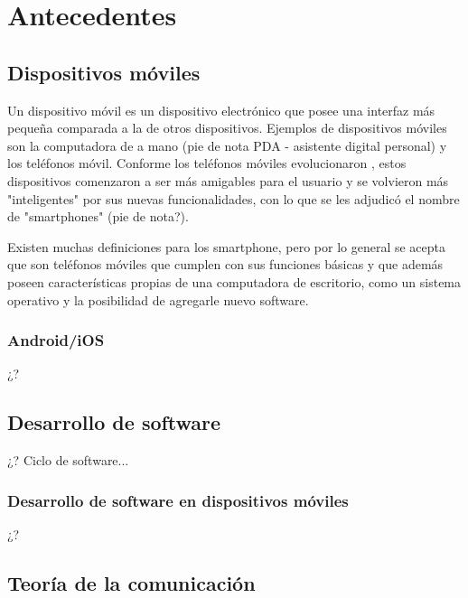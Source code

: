 \chapter{Antecedentes}
\label{antecedentes}

\section{Dispositivos m{\'{o}}viles}

Un dispositivo m{\'{o}}vil es un dispositivo electr{\'{o}}nico 
\citet{ChallengeMobile} que posee una interfaz m{\'{a}}s pequeña 
comparada a la de otros dispositivos. Ejemplos de dispositivos 
m{\'{o}}viles son la computadora de a mano (pie de nota PDA - 
asistente digital personal) y los tel{\'{e}}fonos m{\'{o}}vil. 
Conforme los tel{\'{e}}fonos m{\'{o}}viles evolucionaron 
\citet{MobileEducation}, estos dispositivos comenzaron a ser m{\'{a}}s amigables para el usuario y se volvieron m{\'{a}}s "inteligentes" por sus nuevas funcionalidades, con lo que se les adjudic{\'{o}} el nombre de "smartphones" (pie de nota?).

Existen muchas definiciones para los smartphone, pero por lo general se acepta \citet{MobileEducation} que son tel{\'{e}}fonos m{\'{o}}viles que cumplen con sus funciones b{\'{a}}sicas y que adem{\'{a}}s poseen caracter{\'{i}}sticas propias de una computadora de escritorio, como un sistema operativo y la posibilidad de agregarle nuevo software.

\subsection{Android/iOS}

¿?

\section{Desarrollo de software}

¿? Ciclo de software...

\subsection{Desarrollo de software en dispositivos m{\'{o}}viles}

¿?

\section{Teor{\'{i}}a de la comunicaci{\'{o}}n}

